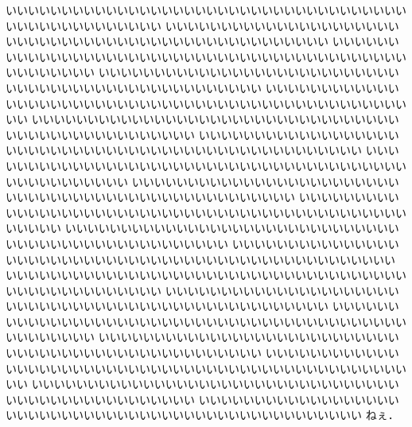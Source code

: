 いいいいいいいいいいいいいいいいいいいいいいいいいいいいいいいいいいいいいいいいいいいいいいいいいい
いいいいいいいいいいいいいいいいいいいいいいいいいいいいいいいいいいいいいいいいいいいいいいいいいい
いいいいいいいいいいいいいいいいいいいいいいいいいいいいいいいいいいいいいいいいいいいいいいいいいい
いいいいいいいいいいいいいいいいいいいいいいいいいいいいいいいいいいいいいいいいいいいいいいいいいい
いいいいいいいいいいいいいいいいいいいいいいいいいいいいいいいいいいいいいいいいいいいいいいいいいい
いいいいいいいいいいいいいいいいいいいいいいいいいいいいいいいいいいいいいいいいいいいいいいいいいい
いいいいいいいいいいいいいいいいいいいいいいいいいいいいいいいいいいいいいいいいいいいいいいいいいい
いいいいいいいいいいいいいいいいいいいいいいいいいいいいいいいいいいいいいいいいいいいいいいいいいい
いいいいいいいいいいいいいいいいいいいいいいいいいいいいいいいいいいいいいいいいいいいいいいいいいい
いいいいいいいいいいいいいいいいいいいいいいいいいいいいいいいいいいいいいいいいいいいいいいいいいい
いいいいいいいいいいいいいいいいいいいいいいいいいいいいいいいいいいいいいいいいいいいいいいいいいい
いいいいいいいいいいいいいいいいいいいいいいいいいいいいいいいいいいいいいいいいいいいいいいいいいい
いいいいいいいいいいいいいいいいいいいいいいいいいいいいいいいいいいいいいいいいいいいいいいいいいい
いいいいいいいいいいいいいいいいいいいいいいいいいいいいいいいいいいいいいいいいいいいいいいいいいい
いいいいいいいいいいいいいいいいいいいいいいいいいいいいいいいいいいいいいいいいいいいいいいいいいい
いいいいいいいいいいいいいいいいいいいいいいいいいいいいいいいいいいいいいいいいいいいいいいいいいい
いいいいいいいいいいいいいいいいいいいいいいいいいいいいいいいいいいいいいいいいいいいいいいいいいい
いいいいいいいいいいいいいいいいいいいいいいいいいいいいいいいいいいいいいいいいいいいいいいいいいい
いいいいいいいいいいいいいいいいいいいいいいいいいいいいいいいいいいいいいいいいいいいいいいいいいい
ねぇ．
